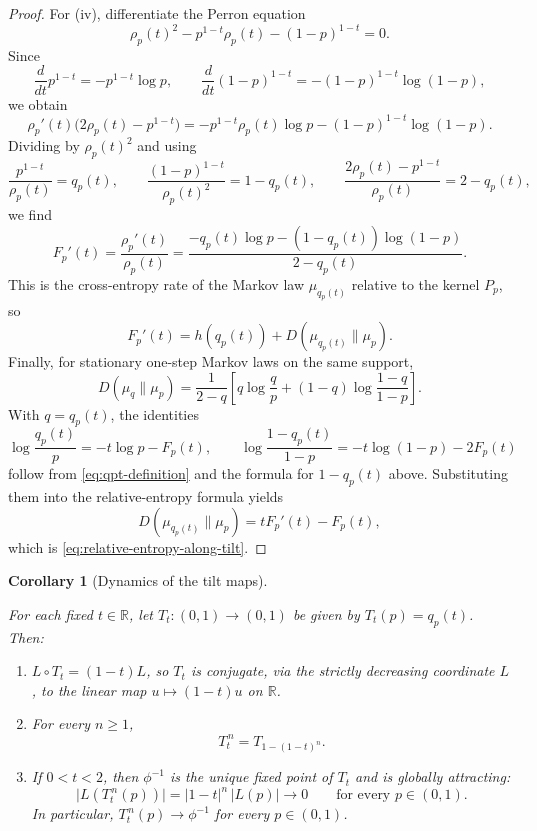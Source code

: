 \documentclass[pdflatex,sn-basic,Numbered]{sn-jnl}
\theoremstyle{thmstyleone}
\newtheorem{corollary}[theorem]{Corollary}
\theoremstyle{thmstyletwo}
\theoremstyle{thmstylethree}
\newcommand{\RR}{\mathbb{R}}
\newcommand{\leanverified}[1]{}
\begin{document}
\begin{proof}
For (iv), differentiate the Perron equation
\[
\rho_p(t)^2-p^{1-t}\rho_p(t)-(1-p)^{1-t}=0.
\]
Since
\[
\frac{d}{dt}p^{1-t}=-p^{1-t}\log p,
\qquad
\frac{d}{dt}(1-p)^{1-t}=-(1-p)^{1-t}\log(1-p),
\]
we obtain
\[
\rho_p'(t)\bigl(2\rho_p(t)-p^{1-t}\bigr)
=
-p^{1-t}\rho_p(t)\log p-(1-p)^{1-t}\log(1-p).
\]
Dividing by $\rho_p(t)^2$ and using
\[
\frac{p^{1-t}}{\rho_p(t)}=q_p(t),
\qquad
\frac{(1-p)^{1-t}}{\rho_p(t)^2}=1-q_p(t),
\qquad
\frac{2\rho_p(t)-p^{1-t}}{\rho_p(t)}=2-q_p(t),
\]
we find
\[
F_p'(t)=\frac{\rho_p'(t)}{\rho_p(t)}
=
\frac{-q_p(t)\log p-(1-q_p(t))\log(1-p)}{2-q_p(t)}.
\]
This is the cross-entropy rate of the Markov law $\mu_{q_p(t)}$ relative to the kernel $P_p$, so
\[
F_p'(t)=h(q_p(t))+D(\mu_{q_p(t)}\|\mu_p).
\]
Finally, for stationary one-step Markov laws on the same support,
\[
D(\mu_q\|\mu_p)
=
\frac{1}{2-q}
\left[
q\log\frac{q}{p}+(1-q)\log\frac{1-q}{1-p}
\right].
\]
With $q=q_p(t)$, the identities
\[
\log\frac{q_p(t)}{p}=-t\log p-F_p(t),
\qquad
\log\frac{1-q_p(t)}{1-p}=-t\log(1-p)-2F_p(t)
\]
follow from \eqref{eq:qpt-definition} and the formula for $1-q_p(t)$ above. Substituting them into the relative-entropy formula yields
\[
D(\mu_{q_p(t)}\|\mu_p)=tF_p'(t)-F_p(t),
\]
which is \eqref{eq:relative-entropy-along-tilt}.
\end{proof}

\begin{corollary}[Dynamics of the tilt maps]\label{cor:tilt-dynamics}
\leanverified{paper_zero_jitter_tilt_dynamics}
For each fixed $t\in\RR$, let $T_t:(0,1)\to(0,1)$ be given by $T_t(p)=q_p(t)$. Then:
\begin{enumerate}[label=(\roman*),leftmargin=*,itemsep=2pt]
  \item $L\circ T_t=(1-t)L$, so $T_t$ is conjugate, via the strictly decreasing coordinate $L$, to the linear map $u\mapsto (1-t)u$ on $\RR$.
  \item For every $n\ge 1$,
  \begin{equation}\label{eq:iterate-formula}
  T_t^{\,n}=T_{1-(1-t)^n}.
  \end{equation}
  \item If $0<t<2$, then $\phi^{-1}$ is the unique fixed point of $T_t$ and is globally attracting:
  \begin{equation}\label{eq:global-attractor}
  \bigl|L(T_t^{\,n}(p))\bigr|=|1-t|^n\,|L(p)|
  \longrightarrow 0
  \qquad\text{for every }p\in(0,1).
  \end{equation}
  In particular, $T_t^{\,n}(p)\to \phi^{-1}$ for every $p\in(0,1)$.
\end{enumerate}
\end{corollary}
\end{document}
